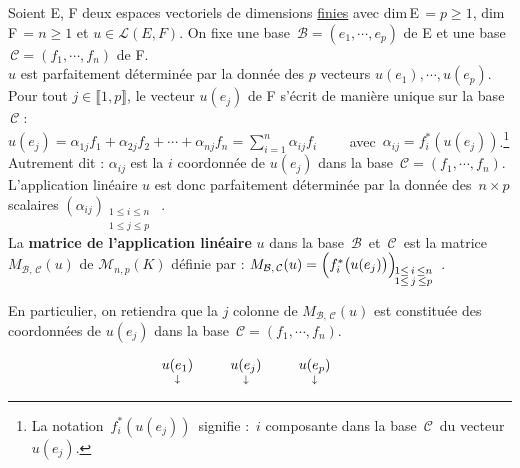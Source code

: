 \vspace{1.7cm}

Soient E, F deux espaces vectoriels de dimensions \underline{finies} avec dim\,E\(\,=p\!\geq\! 1\), dim\,F\(\,=\!n\geq\!1\) et \(u\in \mathscr{L}(E,F)\). On fixe une base \(\, \mathcal{B}=(e_1,\cdots,e_p)\) de E et une base \(\, \mathcal{C}=(f_1,\cdots,f_n)\) de F.\vspace{0.2cm}\\
$u$ est parfaitement déterminée par la donnée des $p$ vecteurs \(u(e_1),\cdots, u(e_p).\)\\
Pour tout \(j\in \llbracket 1,p \rrbracket\), le vecteur \(u(e_j)\) de F s'écrit de manière unique sur la base \(\,\mathcal{C}\;\):\\
\(\displaystyle u(e_j)=\alpha_{1j}f_1+\alpha_{2j}f_2+\cdots+\alpha_{nj}f_n=\sum_{i=1}^{n}\alpha_{ij}f_i \qquad \) avec \(\,\alpha_{ij}=f_i^*(u(e_j))\).\footnote{La notation $\,f_i^*(u(e_j))\,$ signifie : \guillemetleft \,$i$ composante dans la base $\,\mathcal{C}\,$ du vecteur $u(e_j)$\guillemetright.}\\
Autrement dit : \(\alpha_{ij}\) est la $i$ coordonnée de \(u(e_j)\) dans la base \(\,\mathcal{C}=(f_1,\cdots,f_n)\). L'application linéaire $u$ est donc parfaitement déterminée par la donnée des \(\,n\!\times\! p\,\) scalaires \((\alpha_{ij})_{\substack{1\leq i\leq n \\ 1\leq j\leq p}}\)\ .\vspace{0.6cm}\\
La \textbf{matrice de l'application linéaire} $u$ dans la base \(\,\mathcal{B}\,\) et \(\,\mathcal{C}\,\) est la matrice \(M_{\mathcal{B},\,\mathcal{C}}(u)\) de \(\mathcal{M}_{n,p}(K)\) définie par : \(M_{\mathcal{B},\,\mathcal{C}}(u)=\Bigl(f_i^* \bigl( u(e_j) \bigr)\Bigr)_{\substack{\!1\leq \,i\,\leq n \\ \!1\leq \,j\,\leq p}}\)\ .\vspace{0.5cm}

En particulier, on retiendra que la $j$ colonne de \(M_{\mathcal{B},\,\mathcal{C}}(u)\) est constituée des coordonnées de \(u(e_j)\) dans la base \(\, \mathcal{C}=(f_1,\cdots,f_n)\).

\newpage

\[\hspace{-0.7cm} \arraycolsep=0.235cm \begin{array}{ccccc}
    \underset{\downarrow}{u(e_1)} & & \underset{\downarrow}{u(e_j)} & & \underset{\downarrow}{u(e_p)}
\end{array}\vspace{-0.4cm}\]

